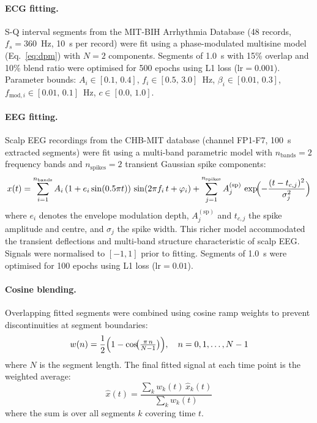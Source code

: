 \documentclass[11pt]{article}
\begin{document}
\paragraph{ECG fitting.}
S-Q interval segments from the MIT-BIH Arrhythmia Database (48 records, $f_s = 360$~Hz, 10~s per record) were fit using a phase-modulated multisine model (Eq.~\eqref{eq:dpm}) with $N = 2$ components. Segments of 1.0~s with 15\% overlap and 10\% blend ratio were optimised for 500 epochs using L1 loss ($\mathrm{lr} = 0.001$). Parameter bounds: $A_i \in [0.1,\, 0.4]$, $f_i \in [0.5,\, 3.0]$~Hz, $\beta_i \in [0.01,\, 0.3]$, $f_{\mathrm{mod},i} \in [0.01,\, 0.1]$~Hz, $c \in [0.0,\, 1.0]$.

\paragraph{EEG fitting.}
Scalp EEG recordings from the CHB-MIT database (channel FP1-F7, 100~s extracted segments) were fit using a multi-band parametric model with $n_{\mathrm{bands}} = 2$ frequency bands and $n_{\mathrm{spikes}} = 2$ transient Gaussian spike components:
\begin{equation}
    x(t) = \sum_{i=1}^{n_{\mathrm{bands}}} A_i\,(1 + e_i \sin(0.5\pi t))\,\sin(2\pi f_i\, t + \varphi_i)
         + \sum_{j=1}^{n_{\mathrm{spikes}}} A_j^{(\mathrm{sp})}\,\exp\!\Bigl(-\frac{(t - t_{c,j})^2}{\sigma_j^2}\Bigr)
    \label{eq:eeg_fit}
\end{equation}
where $e_i$ denotes the envelope modulation depth, $A_j^{(\mathrm{sp})}$ and $t_{c,j}$ the spike amplitude and centre, and $\sigma_j$ the spike width. This richer model accommodated the transient deflections and multi-band structure characteristic of scalp EEG. Signals were normalised to $[-1, 1]$ prior to fitting. Segments of 1.0~s were optimised for 100 epochs using L1 loss ($\mathrm{lr} = 0.01$).

\paragraph{Cosine blending.}
Overlapping fitted segments were combined using cosine ramp weights to prevent discontinuities at segment boundaries:
\begin{equation}
    w(n) = \frac{1}{2}\Bigl(1 - \cos\!\bigl(\tfrac{\pi\, n}{N-1}\bigr)\Bigr), \quad n = 0, 1, \ldots, N-1
    \label{eq:cosine_blend}
\end{equation}
where $N$ is the segment length. The final fitted signal at each time point is the weighted average:
\begin{equation}
    \hat{x}(t) = \frac{\displaystyle\sum_k w_k(t)\,\hat{x}_k(t)}{\displaystyle\sum_k w_k(t)}
    \label{eq:blend_avg}
\end{equation}
where the sum is over all segments $k$ covering time $t$.
\end{document}
